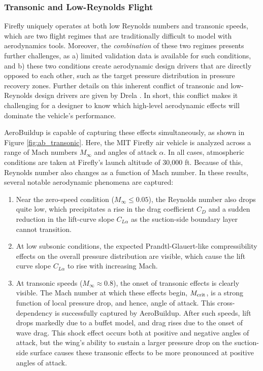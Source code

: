 \subsubsection{Transonic and Low-Reynolds Flight}

Firefly uniquely operates at both low Reynolds numbers and transonic speeds, which are two flight regimes that are traditionally difficult to model with aerodynamics tools. Moreover, the \emph{combination} of these two regimes presents further challenges, as a) limited validation data is available for such conditions, and b) these two conditions create aerodynamic design drivers that are directly opposed to each other, such as the target pressure distribution in pressure recovery zones. Further details on this inherent conflict of transonic and low-Reynolds design drivers are given by Drela \cite{drela_transonic_1992}. In short, this conflict makes it challenging for a designer to know which high-level aerodynamic effects will dominate the vehicle's performance.

AeroBuildup is capable of capturing these effects simultaneously, as shown in Figure \ref{fig:ab_transonic}. Here, the MIT Firefly air vehicle is analyzed across a range of Mach numbers $M_\infty$ and angles of attack $\alpha$. In all cases, atmospheric conditions are taken at Firefly's launch altitude of 30,000 ft. Because of this, Reynolds number also changes as a function of Mach number. In these results, several notable aerodynamic phenomena are captured:

\begin{enumerate}[noitemsep]
    \item Near the zero-speed condition ($M_\infty \leq 0.05$), the Reynolds number also drops quite low, which precipitates a rise in the drag coefficient $C_D$ and a sudden reduction in the lift-curve slope $C_{L \alpha}$ as the suction-side boundary layer cannot transition.
    \item At low subsonic conditions, the expected Prandtl-Glauert-like compressibility effects on the overall pressure distribution are visible, which cause the lift curve slope $C_{L \alpha}$ to rise with increasing Mach.
    \item At transonic speeds ($M_\infty \approx 0.8$), the onset of transonic effects is clearly visible. The Mach number at which these effects begin, $M_{\rm crit}$, is a strong function of local pressure drop, and hence, angle of attack. This cross-dependency is successfully captured by AeroBuildup. After such speeds, lift drops markedly due to a buffet model, and drag rises due to the onset of wave drag. This shock effect occurs both at positive and negative angles of attack, but the wing's ability to sustain a larger pressure drop on the suction-side surface causes these transonic effects to be more pronounced at positive angles of attack.
\end{enumerate}

